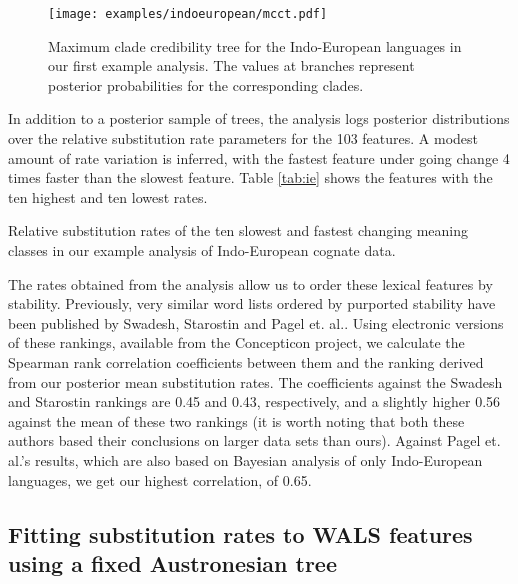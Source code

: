 \documentclass[twocolumn,10pt]{scrartcl}
\begin{document}
\begin{figure}[t]
	\begin{center}
	\texttt{[image: examples/indoeuropean/mcct.pdf]}
	\end{center}
	\caption{Maximum clade credibility tree for the Indo-European languages in our first example analysis.  The values at branches represent posterior probabilities for the corresponding clades.}
\label{fig:ie}
\end{figure}

In addition to a posterior sample of trees, the analysis logs posterior distributions over the relative substitution rate parameters for the 103 features.  A modest amount of rate variation is inferred, with the fastest feature under going change 4 times faster than the slowest feature.  Table \ref{tab:ie} shows the features with the ten highest and ten lowest rates.  
\begin{table}[t]
	\begin{center}
		
	\end{center}
	\caption{Relative substitution rates of the ten slowest and fastest changing meaning classes in our example analysis of Indo-European cognate data.}
\label{tab:ie}
\end{table}

The rates obtained from the analysis allow us to order these lexical features by stability.
Previously, very similar word lists ordered by purported stability have been published by Swadesh\cite{Swadesh1955}, Starostin\cite{Starostin2007} and Pagel et. al.\cite{Pagel2007}.
Using electronic versions of these rankings, available from the Concepticon project\cite{List2015}, we calculate the Spearman rank correlation coefficients \cite{} between them and the ranking derived from our posterior mean substitution rates. The coefficients against the Swadesh and Starostin rankings are 0.45 and 0.43, respectively, and a slightly higher 0.56 against the mean of these two rankings (it is worth noting that both these authors based their conclusions on larger data sets than ours).  Against Pagel et. al.'s results, which are also based on Bayesian analysis of only Indo-European languages, we get our highest correlation, of 0.65.

\subsection{Fitting substitution rates to WALS features using a fixed Austronesian tree}
\end{document}
